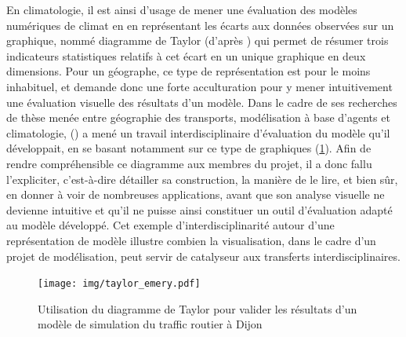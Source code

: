\documentclass[a4paper, 12pt]{article}
\begin{document}
En climatologie, il est ainsi d'usage de mener une évaluation des modèles numériques de climat en en représentant les écarts aux données observées sur un graphique, nommé \og diagramme de Taylor\fg{} (d'après \cite{taylor_summarizing_2001}) qui permet de résumer trois indicateurs statistiques relatifs à cet écart en un unique graphique en deux dimensions.
Pour un géographe, ce type de représentation est pour le moins inhabituel, et demande donc une forte acculturation pour y mener intuitivement une évaluation visuelle des résultats d'un modèle.
Dans le cadre de ses recherches de thèse menée entre géographie des transports, modélisation à base d'agents et climatologie,  (\citeyear{emery_ville_2016}) a mené un travail interdisciplinaire d'évaluation du modèle qu'il développait, en se basant notamment sur ce type de graphiques (\cref{fig:taylor-emery}).
Afin de rendre compréhensible ce diagramme aux membres du projet, il a donc fallu l'expliciter, c'est-à-dire détailler sa construction, la manière de le lire, et bien sûr, en donner à voir de nombreuses applications, avant que son analyse visuelle ne devienne intuitive et qu'il ne puisse ainsi constituer un outil d'évaluation adapté au modèle développé.
Cet exemple d'interdisciplinarité autour d'une représentation de modèle illustre combien la visualisation, dans le cadre d'un projet de modélisation, peut servir de catalyseur aux transferts interdisciplinaires.

\begin{figure}[H]
	\centering
	\texttt{[image: img/taylor\_emery.pdf]}
	\caption{Utilisation du diagramme de Taylor pour valider les résultats d'un modèle de simulation du traffic routier à Dijon \autocite[p. 256]{emery_ville_2016}}
	\label{fig:taylor-emery}
\end{figure}
\end{document}
